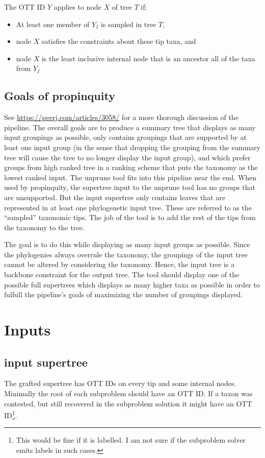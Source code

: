 \documentclass[english]{article}
\begin{document}
The OTT ID $Y$ applies to node $X$ of tree $T$ if:
\begin{itemize}
    \item At least one member of $Y_I$ is sampled in tree $T$,
    \item node $X$ satisfies the constraints about these tip taxa, and
    \item node $X$ is the least inclusive internal node that is an ancestor all of the taxa from $Y_I$
\end{itemize}

\subsection{Goals of propinquity}
See \url{https://peerj.com/articles/3058/} for a more thorough discussion of the pipeline.
The overall goals are to produce a summary tree that displays as many input groupings as
    possible, only contains groupings that are supported by at least one
    input group (in the sense that dropping the grouping from the summary tree will cause
    the tree to no longer display the input group), and which prefer groups from 
    high ranked tree in a ranking scheme that puts the taxonomy as the lowest ranked
    input.
The unprune tool fits into this pipeline near the end.
When used by propinquity, the supertree input to the unprune tool has no
    groups that are unsupported.
But the input supertree only contains leaves that are represented in at least one 
    phylogenetic input tree.
These are referred to as the ``sampled'' taxonomic tips.
The job of the tool is to add the rest of the tips from the taxonomy to the tree.

The goal is to do this while displaying as many input groups as possible.
Since the phylogenies always overrule the taxonomy, the groupings of the input
    tree cannot be altered by considering the taxonomy.
Hence, the input tree is a backbone constraint for the output tree.
The tool should display one of the possible full supertrees which displays as
    many higher taxa as possible in order to fulfull the pipeline's goals of
    maximizing the number of groupings displayed.




\section{Inputs}
\subsection{input supertree}
The grafted supertree has OTT IDs on every tip and some internal nodes.
Minimally the root of each subproblem should have an OTT ID.
If a taxon was contested, but still recovered in the subproblem solution it might
have an OTT ID\footnote{This would be fine if it is labelled. I am not sure
if the subproblem solver emits labels in such cases.}.
\end{document}

